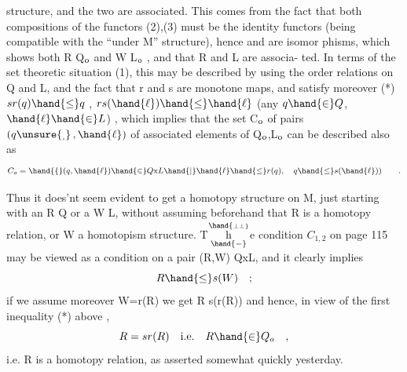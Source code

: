 
structure, and the two are associated. This comes from the fact that
both compositions of the functors (2),(3) must be the identity functors
(being compatible with the ``under M'' structure), hence \hand{\ensuremath{\alpha}} and \hand{\ensuremath{\beta}} are isomor%
phisms, which shows both R \hand{\ensuremath{\in}} Q$_{\rm o}$ and W \hand{\ensuremath{\in}} L$_{\rm o}$ , and that R and L are associa-%
ted. In terms of the set theoretic situation (1), this may be described
by using the order relations on Q and L, and the fact that r and s are
monotone maps, and satisfy moreover
(*) \qquad $sr(q)\hand{\ensuremath{\leq}} q$ \;,\; $rs(\hand{\ensuremath{\ell}})\hand{\ensuremath{\leq}}\hand{\ensuremath{\ell}}$ \quad (any $q\hand{\ensuremath{\in}}Q$, $\hand{\ensuremath{\ell}}\hand{\ensuremath{\in}}L$) \;,
which implies that the set C$_{\rm o}$ of pairs $(q\unsure{_{,}}\,, \hand{\ensuremath{\ell}})$ of associated elements
of Q$_{\rm o}$,L$_{\rm o}$ can be described also as
\[ C_{o} = \hand{\ensuremath{\{}}(q,\hand{\ensuremath{\ell}})\hand{\ensuremath{\in}} Q\text{x}L \hand{\ensuremath{\mid}} \hand{\ensuremath{\ell}}\hand{\ensuremath{\leq}}r(q),\quad q\hand{\ensuremath{\leq}} s(\hand{\ensuremath{\ell}})) \qquad . \]

Thus it does'nt seem evident to get a homotopy structure on M, just
starting with an R \hand{\ensuremath{\in}} Q or  a W \hand{\ensuremath{\in}} L, without assuming beforehand that
R is a homotopy relation, or W a homotopism structure. T$\overset{\hand{\scriptscriptstyle\perp\perp}}{\underset{\hand{-}}{\mathrm h}}$e condition
$C_{1,2}$ on page 115 may be viewed as a condition on a pair (R,W)\hand{\ensuremath{\in}} QxL,
and it clearly implies
\[ R \hand{\ensuremath{\leq}} s(W) \quad ; \]
if we assume moreover \quad W=r(R) \quad we get \quad R\hand{\ensuremath{\leq}} s(r(R)) \quad and hence, in view
of the first inequality (*) above ,
\[ R = sr(R) \quad \text{i.e.} \quad R \hand{\ensuremath{\in}} Q_{o} \quad , \]
i.e. R is a homotopy relation, as asserted somewhat quickly yesterday.

